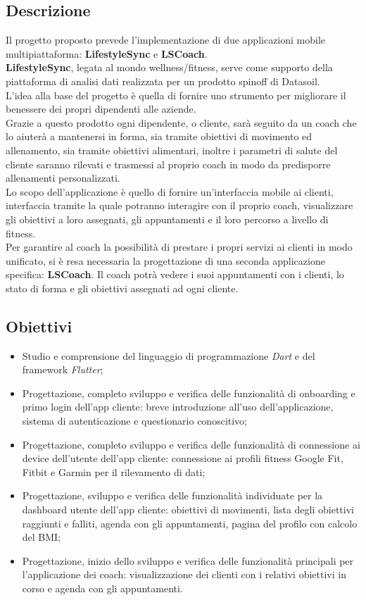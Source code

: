 \subsection{Descrizione}
Il progetto proposto prevede l’implementazione di due applicazioni mobile multipiattaforma: \textbf{LifestyleSync} e \textbf{LSCoach}.\\
\textbf{LifestyleSync}, legata al mondo wellness/fitness, serve come supporto della piattaforma di analisi dati realizzata per un prodotto spinoff di Datasoil. \\
L'idea alla base del progetto è quella di fornire uno strumento per migliorare il benessere dei propri dipendenti alle aziende.\\
Grazie a questo prodotto ogni dipendente, o cliente, sarà seguito da un coach che lo aiuterà a mantenersi in forma, sia tramite obiettivi di movimento ed allenamento, sia tramite obiettivi alimentari, inoltre i parametri di salute del cliente saranno rilevati e trasmessi al proprio coach in modo da predisporre allenamenti personalizzati. \\
Lo scopo dell'applicazione è quello di fornire un'interfaccia mobile ai clienti, interfaccia tramite la quale potranno interagire con il proprio coach, visualizzare gli obiettivi a loro assegnati, gli appuntamenti e il loro percorso a livello di fitness.\\
Per garantire al coach la possibilità di prestare i propri servizi ai clienti in modo unificato, si è resa necessaria la progettazione di una seconda applicazione specifica: \textbf{LSCoach}. Il coach potrà vedere i suoi appuntamenti con i clienti, lo stato di forma e gli obiettivi assegnati ad ogni cliente.

\subsection{Obiettivi}
\begin{itemize}
    \item Studio e comprensione del linguaggio di programmazione \textit{Dart} e del framework \textit{Flutter};
    \item Progettazione, completo sviluppo e verifica delle funzionalità di onboarding e primo login dell'app cliente: breve introduzione all'uso dell'applicazione, sistema di autenticazione e questionario conoscitivo;
    \item Progettazione, completo sviluppo e verifica delle funzionalità di connessione ai device dell'utente dell'app cliente: connessione ai profili fitness Google Fit, Fitbit e Garmin per il rilevamento di dati;
    \item Progettazione, sviluppo e verifica delle funzionalità individuate per la dashboard utente dell'app cliente: obiettivi di movimenti, lista degli obiettivi raggiunti e falliti, agenda con gli appuntamenti, pagina del profilo con calcolo del \gls{BMI};
    \item Progettazione, inizio dello sviluppo e verifica delle funzionalità principali per l'applicazione dei coach: visualizzazione dei clienti con i relativi obiettivi in corso e agenda con gli appuntamenti.
\end{itemize}

